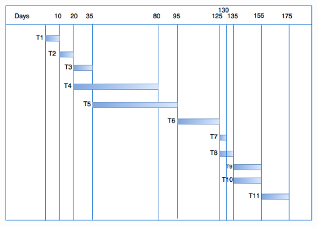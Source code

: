 \documentclass[18pt,oneside,a4paper, titlepage]{article}
\begin{document}
	\vspace{0.5cm}
	\begin{center}
	\centering
	\includegraphics[scale=0.57]{scheduleTask.png}
	\end{center}
	
\newpage
\end{document}
